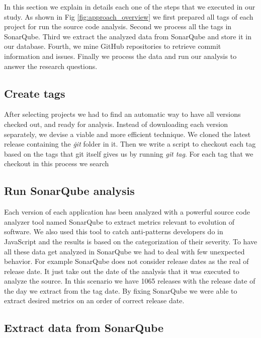 In this section we explain in details each one of the steps that we executed in our study. As shown in Fig \ref{fig:approach_overview} we first prepared all tags of each project for run the source code analysis. Second we process all the tags in SonarQube. Third we extract the analyzed data from SonarQube and store it in our database. Fourth, we mine GitHub repositories to retrieve commit information and issues. Finally we process the data and run our analysis to answer the research questions.  
 
\subsection{Create tags}

After selecting projects we had to find an automatic way to have all versions checked out, and ready for analysis. Instead of downloading each version separately, we devise a viable and more efficient technique. We cloned the latest release containing the \textit{\.git} folder in it. Then we write a script to checkout each tag based on the tags that git itself gives us by running \textit{git tag}. For each tag that we checkout in this process we search 

\subsection{Run SonarQube analysis}

\par
Each version of each application has been analyzed with a powerful source code analyzer tool named SonarQube to extract metrics relevant to evolution of software. We also used this tool to catch anti-patterns developers do in JavaScript and the results is based on the categorization of their severity.
To have all these data get analyzed in SonarQube we had to deal with few unexpected behavior. For example SonarQube does not consider release dates as the real of release date. It just take out the date of the analysis that it was executed to analyze the source. In this scenario we have 1065 releases with the release date of the day we extract from the tag date. By fixing SonarQube we were able to extract desired metrics on an order of correct release date.

\subsection{Extract data from SonarQube}


